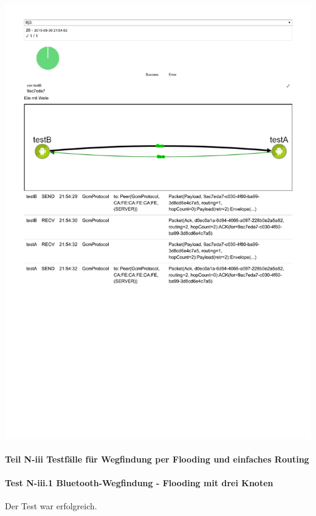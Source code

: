 \includegraphics[trim=0 120 0 0,clip,scale=0.8]{belege/manuelle-tests/netzwerk/Dashboardauszuege/Netzwerktest_II-3.pdf}
\clearpage


\paragraph{Teil N-iii Testfälle für Wegfindung per Flooding und einfaches Routing}

\paragraph{Test N-iii.1 Bluetooth-Wegfindung - Flooding mit drei Knoten}

Der Test war erfolgreich.

